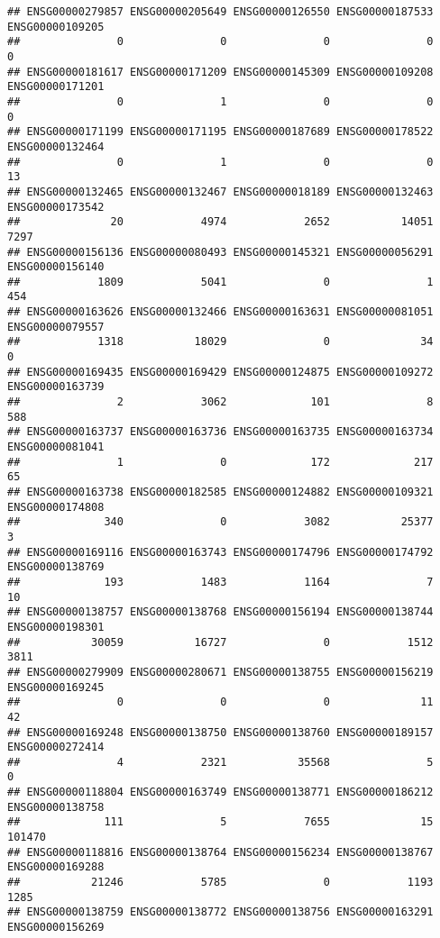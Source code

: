 \documentclass[
]{article}
\begin{document}
\begin{verbatim}
## ENSG00000279857 ENSG00000205649 ENSG00000126550 ENSG00000187533 ENSG00000109205 
##               0               0               0               0               0 
## ENSG00000181617 ENSG00000171209 ENSG00000145309 ENSG00000109208 ENSG00000171201 
##               0               1               0               0               0 
## ENSG00000171199 ENSG00000171195 ENSG00000187689 ENSG00000178522 ENSG00000132464 
##               0               1               0               0              13 
## ENSG00000132465 ENSG00000132467 ENSG00000018189 ENSG00000132463 ENSG00000173542 
##              20            4974            2652           14051            7297 
## ENSG00000156136 ENSG00000080493 ENSG00000145321 ENSG00000056291 ENSG00000156140 
##            1809            5041               0               1             454 
## ENSG00000163626 ENSG00000132466 ENSG00000163631 ENSG00000081051 ENSG00000079557 
##            1318           18029               0              34               0 
## ENSG00000169435 ENSG00000169429 ENSG00000124875 ENSG00000109272 ENSG00000163739 
##               2            3062             101               8             588 
## ENSG00000163737 ENSG00000163736 ENSG00000163735 ENSG00000163734 ENSG00000081041 
##               1               0             172             217              65 
## ENSG00000163738 ENSG00000182585 ENSG00000124882 ENSG00000109321 ENSG00000174808 
##             340               0            3082           25377               3 
## ENSG00000169116 ENSG00000163743 ENSG00000174796 ENSG00000174792 ENSG00000138769 
##             193            1483            1164               7              10 
## ENSG00000138757 ENSG00000138768 ENSG00000156194 ENSG00000138744 ENSG00000198301 
##           30059           16727               0            1512            3811 
## ENSG00000279909 ENSG00000280671 ENSG00000138755 ENSG00000156219 ENSG00000169245 
##               0               0               0              11              42 
## ENSG00000169248 ENSG00000138750 ENSG00000138760 ENSG00000189157 ENSG00000272414 
##               4            2321           35568               5               0 
## ENSG00000118804 ENSG00000163749 ENSG00000138771 ENSG00000186212 ENSG00000138758 
##             111               5            7655              15          101470 
## ENSG00000118816 ENSG00000138764 ENSG00000156234 ENSG00000138767 ENSG00000169288 
##           21246            5785               0            1193            1285 
## ENSG00000138759 ENSG00000138772 ENSG00000138756 ENSG00000163291 ENSG00000156269 

\end{verbatim}
\end{document}
